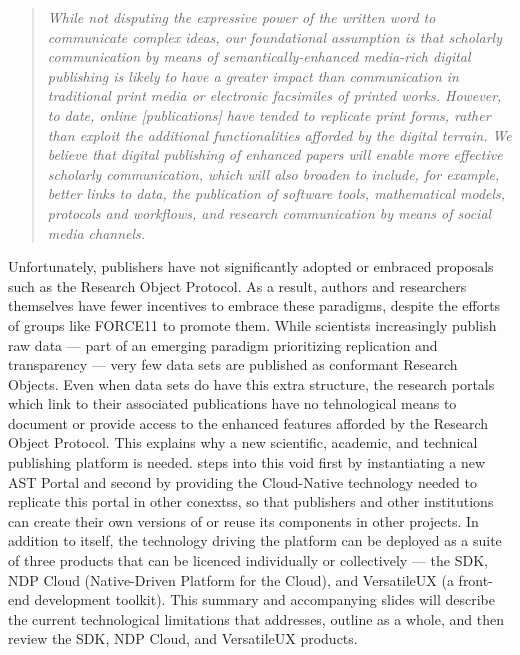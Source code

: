 \documentclass[11pt,letterpaper]{article}
\begin{document}
\begin{quote}
{\textit{While not disputing the expressive power of the written 
word to communicate complex ideas, our foundational assumption 
is that scholarly communication by means of semantically-enhanced 
media-rich digital publishing is likely to have a greater impact 
than communication in traditional print media or electronic 
facsimiles of printed works.  However, to date, online [publications] 
have tended to replicate print forms, rather than exploit the 
additional functionalities afforded by the digital terrain.  
We believe that digital publishing of enhanced papers will enable 
more effective scholarly communication, which will also broaden 
to include, for example, better links to data, the publication of 
software tools, mathematical models, protocols and workflows, and 
research communication by means of social media channels.}}
\end{quote}
\qvspace{}
\p{}
Unfortunately, publishers have not significantly adopted 
or embraced proposals such as the Research Object Protocol.  
As a result, authors and researchers themselves have 
fewer incentives to embrace these paradigms, 
despite the efforts of groups like FORCE11 to promote them.  
While scientists increasingly publish raw data --- part of 
an emerging paradigm prioritizing replication 
and transparency --- very few data sets are published 
as conformant Research Objects.  
Even when data sets do have this 
extra structure, the research portals which 
link to their associated publications have 
no tehnological means to document 
or provide access to the enhanced features 
afforded by the Research Object Protocol.
\p{}
This explains why a new scientific, academic, and technical 
publishing platform is needed.  {\MOSAIC} 
steps into this void first by instantiating a new 
AST Portal and second by providing the Cloud-Native 
technology needed to replicate this portal in 
other conextss, so that publishers and 
other institutions can create their own versions of 
{\MOSAIC} or reuse its components in other projects.
\p{}
In addition to {\MOSAIC} itself, 
the technology driving the platform can be 
deployed as a suite of three products that can 
be licenced individually or collectively --- the
{\MOSAIC} SDK, NDP Cloud (Native-Driven Platform 
for the Cloud), and VersatileUX (a front-end 
development toolkit).  
\p{}
This summary and accompanying slides will describe the 
current technological limitations that {\MOSAIC} 
addresses, outline {\MOSAIC} as a whole, 
and then review the {\MOSAIC} SDK, NDP Cloud, 
and VersatileUX products.
\p{}
\end{document}
